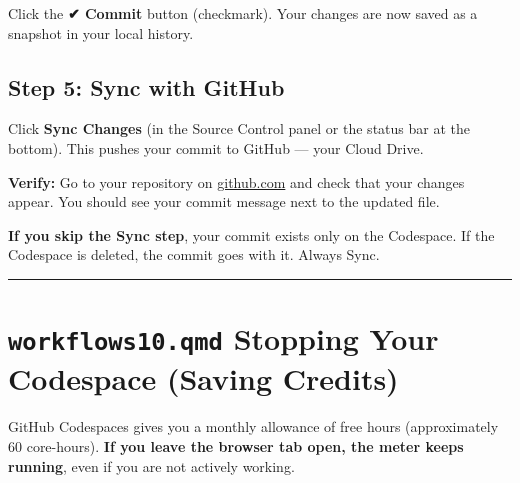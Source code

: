 \documentclass[
  letterpaper,
  DIV=11,
  numbers=noendperiod,
  oneside]{scrreprt}
\begin{document}
Click the \textbf{✔ Commit} button (checkmark). Your changes are now
saved as a snapshot in your local history.

\subsection*{Step 5: Sync with GitHub}\label{step-5-sync-with-github}

Click \textbf{Sync Changes} (in the Source Control panel or the status
bar at the bottom). This pushes your commit to GitHub --- your Cloud
Drive.

\textbf{Verify:} Go to your repository on
\href{https://github.com}{github.com} and check that your changes
appear. You should see your commit message next to the updated file.

\begin{tcolorbox}[enhanced jigsaw, opacitybacktitle=0.6, colbacktitle=quarto-callout-warning-color!10!white, breakable, opacityback=0, coltitle=black, toptitle=1mm, bottomrule=.15mm, colframe=quarto-callout-warning-color-frame, bottomtitle=1mm, colback=white, leftrule=.75mm, rightrule=.15mm, title=\textcolor{quarto-callout-warning-color}{\faExclamationTriangle}\hspace{0.5em}{Warning}, left=2mm, arc=.35mm, toprule=.15mm, titlerule=0mm]

\textbf{If you skip the Sync step}, your commit exists only on the
Codespace. If the Codespace is deleted, the commit goes with it. Always
Sync.

\end{tcolorbox}

\begin{center}\rule{0.5\linewidth}{0.5pt}\end{center}

\section*{\texorpdfstring{\texttt{workflows10.qmd} Stopping Your
Codespace (Saving
Credits)}{workflows10.qmd Stopping Your Codespace (Saving Credits)}}\label{workflows10.qmd-stopping-your-codespace-saving-credits}


GitHub Codespaces gives you a monthly allowance of free hours
(approximately 60 core-hours). \textbf{If you leave the browser tab
open, the meter keeps running}, even if you are not actively working.
\end{document}
